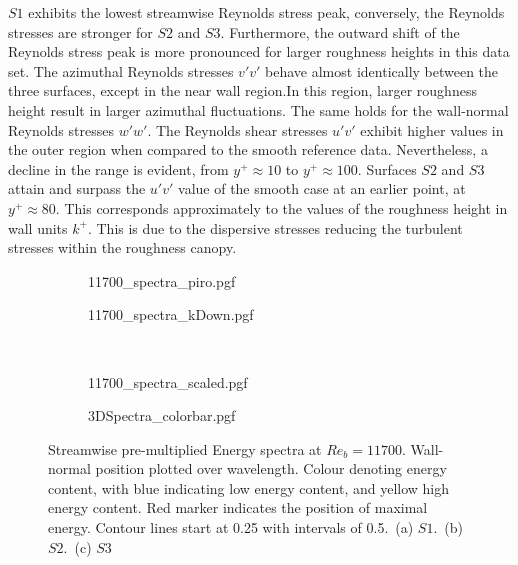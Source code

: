 $S1$ exhibits the lowest streamwise Reynolds stress peak, conversely, the Reynolds stresses are stronger for $S2$ and $S3$.
Furthermore, the outward shift of the Reynolds stress peak is more pronounced for larger roughness heights in this data set.
The azimuthal Reynolds stresses $v'v'$ behave almost identically between the three surfaces, except in the near wall region.In this region,  larger roughness height result in larger  azimuthal fluctuations.
The same holds for the wall-normal Reynolds stresses $w'w'$.
The Reynolds shear stresses $u'v'$ exhibit higher values in the outer region when compared to the smooth reference data.
Nevertheless, a decline in the range is evident, from $y^+ \approx 10$ to $y^+ \approx 100$.
Surfaces $S2$ and $S3$ attain and surpass the $u'v'$ value of the smooth case at an earlier point,  at $y^+ \approx 80$. This corresponds approximately to the  values of the roughness height in wall units $k^+$.
This is due to the dispersive stresses reducing the turbulent stresses within the roughness  canopy.

\begin{figure}
    \centering
    \begin{subfigure}{0.495\textwidth}
        \subcaption{}
        {11700_spectra_piro.pgf}
        \label{subfig: 11700 spectra piro}
    \end{subfigure}
    \hfill
        \begin{subfigure}{0.495\textwidth}
            \subcaption{}
            {11700_spectra_kDown.pgf}
            \label{subfig: 11700 spectra kDown}
    \end{subfigure}
    \\[-20pt]
    \begin{subfigure}{0.495\textwidth}
        \subcaption{}
        {11700_spectra_scaled.pgf}
        \label{subfig: 11700 spectra scaled}
    \end{subfigure}
    \centering
    \begin{subfigure}{\textwidth}
        \centering
        \hspace{0.9cm}
        {3DSpectra_colorbar.pgf}
    \end{subfigure}
    \caption[Streamwise pre-multiplied energy spectra at $Re_b = 11700$]{Streamwise pre-multiplied Energy spectra at $Re_b = 11700$. Wall-normal position plotted over wavelength. Colour denoting energy content, with blue indicating low energy content, and yellow high energy content. Red marker indicates the position of maximal energy. Contour lines start at 0.25 with intervals of 0.5.~(a) $S1$.~(b) $S2$.~(c) $S3$}
    \label{fig: energy spectra 11700}
\end{figure}


